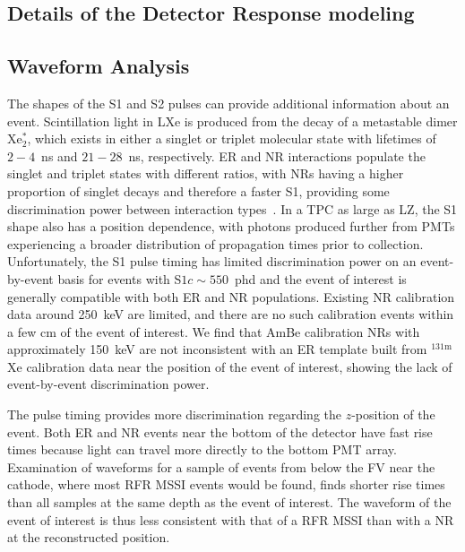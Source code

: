 


\subsection{Details of the Detector Response modeling}



\subsection{Waveform Analysis}
The shapes of the S1 and S2 pulses can provide additional information about an event. Scintillation light in LXe is produced from the decay of a metastable dimer Xe$^*_2$, which exists in either a singlet or triplet molecular state with lifetimes of $2-4$~ns and $21-28$~ns, respectively.
ER and NR interactions populate the singlet and triplet states with different ratios, with NRs having a higher proportion of singlet decays and therefore a faster S1, providing some discrimination power between interaction types~\cite{PSD:Theory,PSD:time1,PSD:time2,PSD:time3,XMASS:2018hil,LZ:PSD_2026}.
In a TPC as large as LZ, the S1 shape also has a position dependence, with photons produced further from PMTs experiencing a broader distribution of propagation times prior to collection.
Unfortunately, the S1 pulse timing has limited discrimination power on an event-by-event basis for events with S$1c\sim550$~phd and the event of interest is generally compatible with both ER and NR populations. Existing NR calibration data around 250~keV are limited, and there are no such calibration events within a few cm of the event of interest. We find that AmBe calibration NRs with approximately 150~keV are not inconsistent with an ER template built from $^{131\text{m}}$Xe calibration data near the position of the event of interest, showing the lack of event-by-event discrimination power.  


The pulse timing provides more discrimination regarding the $z$-position of the event. Both ER and NR events near the bottom of the detector have fast rise times because light can travel more directly to the bottom PMT array.  Examination of waveforms for a sample of events from below the FV near the cathode, where most RFR MSSI events would be found, finds shorter rise times than all samples at the same depth as the event of interest. The waveform of the event of interest is thus less consistent with that of a RFR MSSI than with a NR at the reconstructed position.


